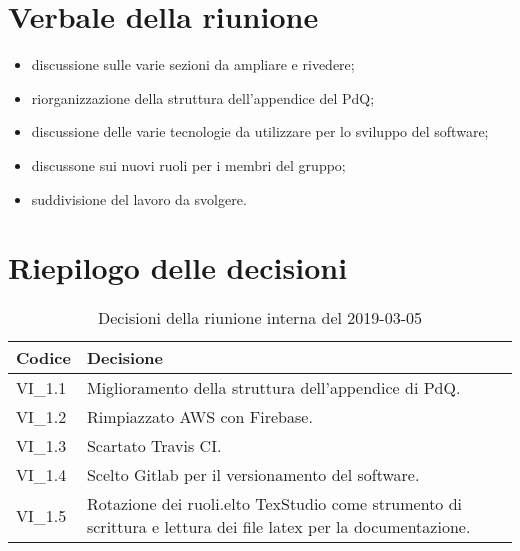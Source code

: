 \section{Verbale della riunione}
\begin{itemize}
	\item discussione sulle varie sezioni da ampliare e rivedere;
	\item riorganizzazione della struttura dell'appendice del PdQ;
	\item discussione delle varie tecnologie da utilizzare per lo sviluppo del software;
	\item discussone sui nuovi ruoli per i membri del gruppo;
	\item suddivisione del lavoro da svolgere.

\end{itemize} 
\pagebreak
\section{Riepilogo delle decisioni}

	
	\begin{longtable}{ >{\centering}p{} >{}p{}}
		\caption{Decisioni della riunione interna del 2019-03-05}\\	
		\rowcolorhead
		\textbf{\color{white}Codice} 
		& \centering\textbf{\color{white}Decisione} 
		\tabularnewline 
		\endfirsthead
		VI\_1.1 & Miglioramento della struttura dell'appendice di PdQ.
		
		\tabularnewline 
		VI\_1.2 & Rimpiazzato AWS con Firebase.
		
		\tabularnewline 
		VI\_1.3 & Scartato Travis CI.
	
		\tabularnewline 
		VI\_1.4 & Scelto Gitlab per il versionamento del software.
		
		\tabularnewline 
		VI\_1.5 & Rotazione dei ruoli.elto TexStudio come strumento di scrittura e lettura dei file latex per la documentazione.
	
	\end{longtable}
	




